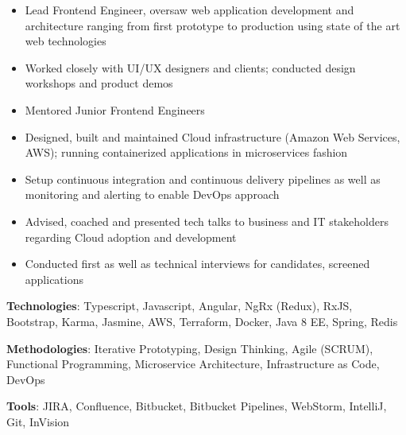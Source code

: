 \documentclass[10pt, a4paper, ragged2e]{altacv}
\begin{document}
	
		
\begin{fullwidth}
	\makecvheader
\end{fullwidth}	



\begin{itemize}
	\item Lead Frontend Engineer, oversaw web application development and architecture ranging from first prototype to production using state of the art web technologies
	\item Worked closely with UI/UX designers and clients; conducted design workshops and product demos
	\item Mentored Junior Frontend Engineers
	\item Designed, built and maintained Cloud infrastructure (Amazon Web Services, AWS); running containerized applications in microservices fashion
	\item Setup continuous integration and continuous delivery pipelines as well as monitoring and alerting to enable DevOps approach
	\item Advised, coached and presented tech talks to business and IT stakeholders regarding Cloud adoption and development
	\item Conducted first as well as technical interviews for candidates, screened applications
\end{itemize}

\smallskip
\textbf{Technologies}: Typescript, Javascript, Angular, NgRx (Redux), RxJS, Bootstrap, Karma, Jasmine, AWS, Terraform, Docker, Java 8 EE, Spring, Redis

\smallskip
\textbf{Methodologies}: Iterative Prototyping, Design Thinking, Agile (SCRUM), Functional Programming, Microservice Architecture, Infrastructure as Code, DevOps

\smallskip
\textbf{Tools}: JIRA, Confluence, Bitbucket, Bitbucket Pipelines, WebStorm, IntelliJ, Git, InVision
\end{document}
